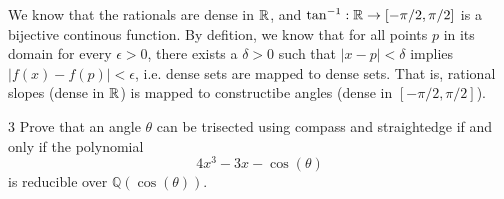 \documentclass[12pt]{article}
\begin{document}
\begin{solution}
\begin{enumerate}
\begin{center}
        \end{center}
    \end{enumerate}

    We know that the rationals are dense in $\mathbb R$, and $\tan^{-1}: \mathbb R \to [-\pi/2, \pi/2]$ is a bijective continous function. By defition, we know that for all points \(p\) in its domain for every \(\epsilon >0\), there exists a \(\delta >0\) such that \(|x-p|<\delta \) implies \(|f(x)-f(p)|<\epsilon \), i.e. dense sets are mapped to dense sets. That is, rational slopes (dense in $\mathbb R$) is mapped to constructibe angles (dense in $[-\pi/2, \pi/2]$). 
\end{solution}

\newpage 

\begin{problem}{3}
    Prove that an angle $\theta$ can be trisected using compass and straightedge if and only if the polynomial
    \[4x^3 - 3x - \cos(\theta)\]
    is reducible over $\mathbb{Q}(\cos(\theta))$.
\end{problem}
\end{document}
